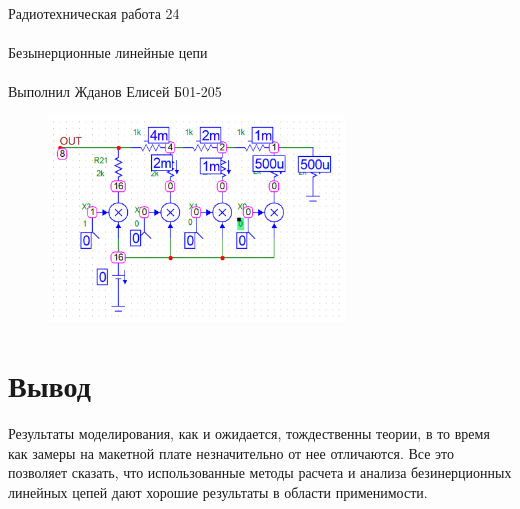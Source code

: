 \documentclass{astroedu-lab}
\begin{document}
\begin{problem}{\huge Радиотехническая работа 24\\\\Безынерционные линейные цепи\\\\Выполнил Жданов Елисей Б01-205}
\begin{figure}[!h]
	\centering
	\includegraphics[width=0.7\textwidth]{19h.png}
	\label{fig:boiler}
\end{figure}

\newpage

\section{Вывод}

Результаты моделирования, как и ожидается, тождественны теории, в то время как замеры на макетной плате незначительно от нее отличаются. Все это позволяет сказать, что использованные методы расчета и анализа безинерционных линейных цепей дают хорошие результаты в области применимости.


\end{problem}
\end{document}

